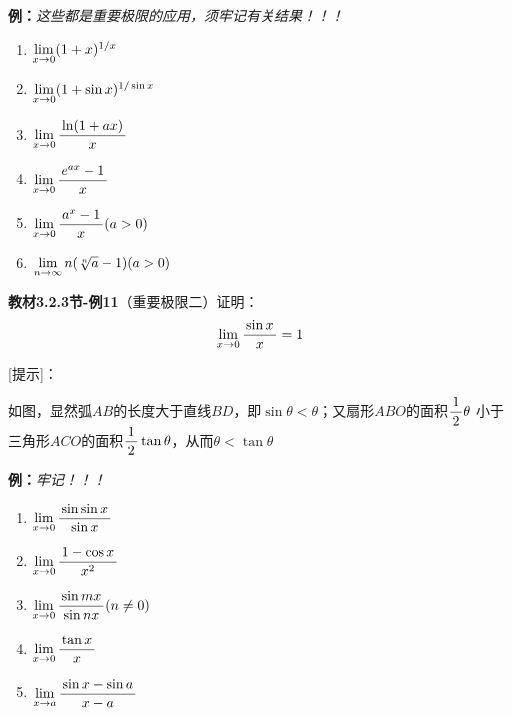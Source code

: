 {\b{\bf 例：}{\it 这些都是重要极限的应用，须牢记有关结果！！！}
\begin{enumerate}[(1)]
  \setlength{\itemindent}{1cm}
  \item $\limx{0}(1+x)^{1/x}$ 
  \item $\limx 0(1+\sin x)^{1/\sin x}$ 
  \item $\limx 0\df{\ln(1+ax)}{x}$
  \item $\limx 0\df{e^{ax}-1}{x}$ 
  \item $\limx 0\df{a^x-1}{x}(a>0)$ 
  \item $\limn n(\sqrt[n]{a}-1) (a>0)$ 
\end{enumerate}}

{\bf 教材3.2.3节-例11}（重要极限二）证明：
$$\limx{0}\df {\sin x}x=1$$

{[提示]}：
\begin{center}
\end{center}

如图，显然弧$AB$的长度大于直线$BD$，即$\sin\theta<\theta$；又扇形$ABO$的面积$\df12\theta$
小于三角形$ACO$的面积$\df12\tan\theta$，从而$\theta<\tan\theta$

{\b{\bf 例：}{\it 牢记！！！}
\begin{enumerate}[(1)]
  \setlength{\itemindent}{1cm}
  \item $\limx{0}\df{\sin\sin x}{\sin x}$ 
  \item $\limx 0\df{1-\cos x}{x^2}$ 
  \item $\limx 0\df{\sin mx}{\sin nx}(n\ne 0)$
  \item $\limx 0\df{\tan x}{x}$
  \item $\limx a\df{\sin x-\sin a}{x-a}$
\end{enumerate}}

